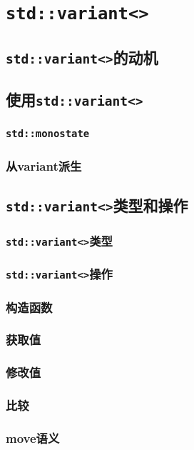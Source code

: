 \section{\texttt{std::variant<>}}\label{ch16}

\subsection{\texttt{std::variant<>}的动机}

\subsection{使用\texttt{std::variant<>}}
\subsubsection*{\texttt{std::monostate}}
\subsubsection*{从variant派生}

\subsection{\texttt{std::variant<>}类型和操作}

\subsubsection{\texttt{std::variant<>}类型}

\subsubsection{\texttt{std::variant<>}操作}
\subsubsection*{构造函数}
\subsubsection*{获取值}
\subsubsection*{修改值}
\subsubsection*{比较}
\subsubsection*{move语义}
